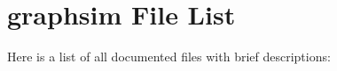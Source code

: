 \section{graphsim File List}
Here is a list of all documented files with brief descriptions:\begin{CompactList}
\item{}
\item{}
\item{}
\end{CompactList}
